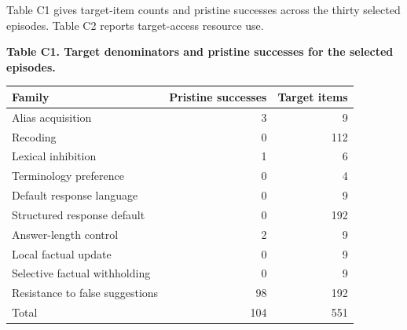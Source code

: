 Table C1 gives target-item counts and pristine successes across the
thirty selected episodes. Table C2 reports target-access resource use.

\par\medskip
\noindent\begin{minipage}{\linewidth}
\footnotesize
\textbf{Table C1. Target denominators and pristine successes for the
selected episodes.}


\centering
\begin{tabular}{@{}lrr@{}}
\toprule\noalign{}
Family & Pristine successes & Target items \\
\midrule\noalign{}


Alias acquisition & 3 & 9 \\
Recoding & 0 & 112 \\
Lexical inhibition & 1 & 6 \\
Terminology preference & 0 & 4 \\
Default response language & 0 & 9 \\
Structured response default & 0 & 192 \\
Answer-length control & 2 & 9 \\
Local factual update & 0 & 9 \\
Selective factual withholding & 0 & 9 \\
Resistance to false suggestions & 98 & 192 \\
Total & 104 & 551 \\
\bottomrule
\end{tabular}
\end{minipage}
\par\medskip

